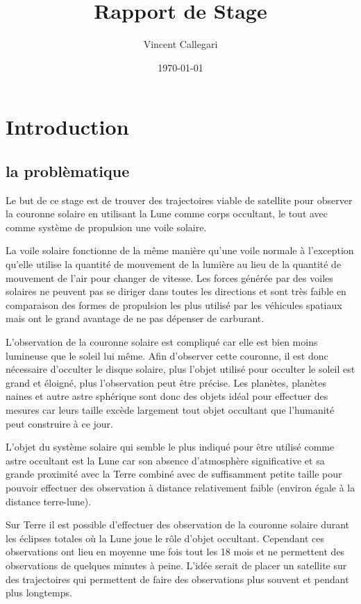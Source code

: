 \documentclass{article} %
\title{Rapport de Stage} %
\author{Vincent Callegari} %
\date{\today} %
\begin{document}
		\maketitle
		\newpage
		\tableofcontents
		\newpage
		\section{Introduction}
		
		\subsection{la problèmatique}
		Le but de ce stage est de trouver des trajectoires viable de satellite pour observer la couronne solaire en utilisant la Lune comme corps occultant, le tout avec comme système de propulsion une voile solaire.
		
		La voile solaire fonctionne de la même manière qu'une voile normale à l'exception qu'elle utilise la quantité de mouvement de la lumière au lieu de la quantité de mouvement de l'air pour changer de vitesse. Les forces générée par des voiles solaires ne peuvent pas se diriger dans toutes les directions et sont très faible en comparaison des formes de propulsion les plus utilisé par les véhicules spatiaux mais ont le grand avantage de ne pas dépenser de carburant.
		
		L'observation de la couronne solaire est compliqué car elle est bien moins lumineuse que le soleil lui même. Afin d'observer cette couronne, il est donc nécessaire d'occulter le disque solaire, plus l'objet utilisé pour occulter le soleil est grand et éloigné, plus l'observation peut être précise. Les planètes, planètes naines et autre astre sphérique sont donc des objets idéal pour effectuer des mesures car leurs taille excède largement tout objet occultant que l'humanité peut construire à ce jour.
		
		L'objet du système solaire qui semble le plus indiqué pour être utilisé comme astre occultant est la Lune car son absence d'atmosphère significative et sa grande proximité avec la Terre combiné avec de suffisamment petite taille pour pouvoir effectuer des observation à distance relativement faible (environ égale à la distance terre-lune).
		
		Sur Terre il est possible d'effectuer des observation de la couronne solaire durant les éclipses totales où la Lune joue le rôle d'objet occultant. Cependant ces observations ont lieu en moyenne une fois tout les 18 mois et ne permettent des observations de quelques minutes à peine. L'idée serait de placer un satellite sur des trajectoires qui permettent de faire des observations plus souvent et pendant plus longtemps. 
		 
\end{document}
